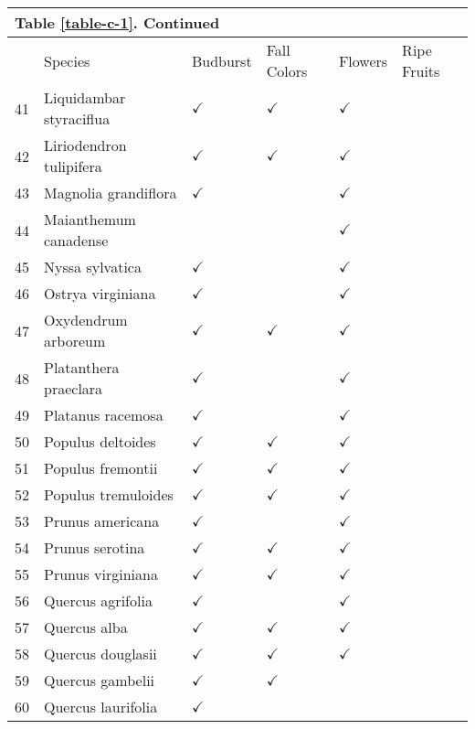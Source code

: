 
\begin{table}
\begin{tabularx}{\textwidth}{p{0.5cm}XXXXX}
\multicolumn{3}{l}{Table \ref{table-c-1}. Continued}\\
\hline
& Species & Budburst & Fall Colors & Flowers & Ripe Fruits\\
\hline
41 & Liquidambar styraciflua & $\checkmark$ & $\checkmark$ & $\checkmark$ &  \\ 
42 & Liriodendron tulipifera & $\checkmark$ & $\checkmark$ & $\checkmark$ &  \\ 
43 & Magnolia grandiflora & $\checkmark$ &  & $\checkmark$ &  \\ 
44 & Maianthemum canadense &  &  & $\checkmark$ &  \\ 
45 & Nyssa sylvatica & $\checkmark$ &  & $\checkmark$ &  \\ 
46 & Ostrya virginiana & $\checkmark$ &  & $\checkmark$ &  \\ 
47 & Oxydendrum arboreum & $\checkmark$ & $\checkmark$ & $\checkmark$ &  \\ 
48 & Platanthera praeclara & $\checkmark$ &  & $\checkmark$ &  \\ 
49 & Platanus racemosa & $\checkmark$ &  & $\checkmark$ &  \\ 
50 & Populus deltoides & $\checkmark$ & $\checkmark$ & $\checkmark$ &  \\ 
51 & Populus fremontii & $\checkmark$ & $\checkmark$ & $\checkmark$ &  \\ 
52 & Populus tremuloides & $\checkmark$ & $\checkmark$ & $\checkmark$ &  \\ 
53 & Prunus americana & $\checkmark$ &  & $\checkmark$ &  \\ 
54 & Prunus serotina & $\checkmark$ & $\checkmark$ & $\checkmark$ &  \\ 
55 & Prunus virginiana & $\checkmark$ & $\checkmark$ & $\checkmark$ &  \\ 
56 & Quercus agrifolia & $\checkmark$ &  & $\checkmark$ &  \\ 
57 & Quercus alba & $\checkmark$ & $\checkmark$ & $\checkmark$ &  \\ 
58 & Quercus douglasii & $\checkmark$ & $\checkmark$ & $\checkmark$ &  \\ 
59 & Quercus gambelii & $\checkmark$ & $\checkmark$ &  &  \\ 
60 & Quercus laurifolia & $\checkmark$ &  &  &  \\ 



\hline
\end{tabularx}
\end{table}

